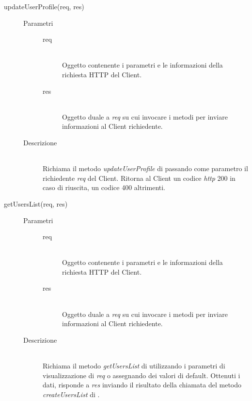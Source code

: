 \begin{description}
\begin{description}
    \item[updateUserProfile(req, res)] \hfill
      \begin{description}
	\item[Parametri] \hfill
	  \begin{description}
	    \item[req] \hfill \\
	    Oggetto contenente i parametri e le informazioni della richiesta HTTP del Client.
	    \item[res] \hfill \\
	    Oggetto duale a \textit{req} su cui invocare i metodi per inviare informazioni al Client richiedente.
	  \end{description}
	\item[Descrizione] \hfill \\
	Richiama il metodo \textit{updateUserProfile} di  passando come parametro il richiedente \textit{req} del Client. Ritorna al Client un codice \textit{http} 200 in caso di riuscita, un codice 400 altrimenti.

      \end{description}
      
    \item[getUsersList(req, res)] \hfill
      \begin{description}
	\item[Parametri] \hfill
	  \begin{description}
	    \item[req] \hfill \\
	    Oggetto contenente i parametri e le informazioni della richiesta HTTP del Client.
	    \item[res] \hfill \\
	    Oggetto duale a \textit{req} su cui invocare i metodi per inviare informazioni al Client richiedente.
	  \end{description}
	\item[Descrizione] \hfill \\
	Richiama il metodo \textit{getUsersList} di  utilizzando i parametri di visualizzazione di \textit{req} o assegnando dei valori di default. Ottenuti i dati, risponde a \textit{res} inviando il risultato della chiamata del metodo \textit{createUsersList} di .
      \end{description}
      

\end{description}
\end{description}
